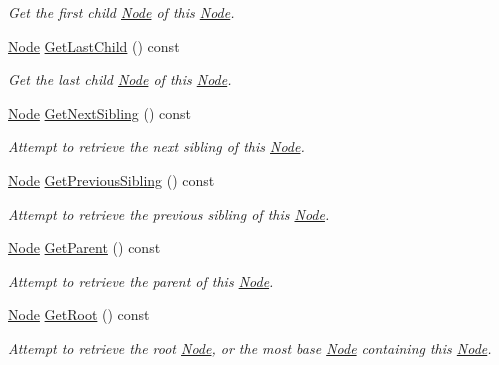 \begin{DoxyCompactItemize}
\begin{DoxyCompactList}\small\item\em Get the first child \hyperlink{classphys_1_1xml_1_1Node}{Node} of this \hyperlink{classphys_1_1xml_1_1Node}{Node}. \item\end{DoxyCompactList}\item 
\hyperlink{classphys_1_1xml_1_1Node}{Node} \hyperlink{classphys_1_1xml_1_1Node_a10f1a568c8c2c691126f1a9ed2afb922}{GetLastChild} () const 
\begin{DoxyCompactList}\small\item\em Get the last child \hyperlink{classphys_1_1xml_1_1Node}{Node} of this \hyperlink{classphys_1_1xml_1_1Node}{Node}. \item\end{DoxyCompactList}\item 
\hyperlink{classphys_1_1xml_1_1Node}{Node} \hyperlink{classphys_1_1xml_1_1Node_a079c3f9835d5ee05b827ba540764e8bb}{GetNextSibling} () const 
\begin{DoxyCompactList}\small\item\em Attempt to retrieve the next sibling of this \hyperlink{classphys_1_1xml_1_1Node}{Node}. \item\end{DoxyCompactList}\item 
\hyperlink{classphys_1_1xml_1_1Node}{Node} \hyperlink{classphys_1_1xml_1_1Node_aef027853db1468edcebb6dbdef6031a3}{GetPreviousSibling} () const 
\begin{DoxyCompactList}\small\item\em Attempt to retrieve the previous sibling of this \hyperlink{classphys_1_1xml_1_1Node}{Node}. \item\end{DoxyCompactList}\item 
\hyperlink{classphys_1_1xml_1_1Node}{Node} \hyperlink{classphys_1_1xml_1_1Node_a80f32b90ed88ef442f99dc7a5f29ca0d}{GetParent} () const 
\begin{DoxyCompactList}\small\item\em Attempt to retrieve the parent of this \hyperlink{classphys_1_1xml_1_1Node}{Node}. \item\end{DoxyCompactList}\item 
\hyperlink{classphys_1_1xml_1_1Node}{Node} \hyperlink{classphys_1_1xml_1_1Node_a19eeb7427a38ea7d8543ed0ae8508b2c}{GetRoot} () const 
\begin{DoxyCompactList}\small\item\em Attempt to retrieve the root \hyperlink{classphys_1_1xml_1_1Node}{Node}, or the most base \hyperlink{classphys_1_1xml_1_1Node}{Node} containing this \hyperlink{classphys_1_1xml_1_1Node}{Node}. \item\end{DoxyCompactList}\item 

\end{DoxyCompactItemize}
